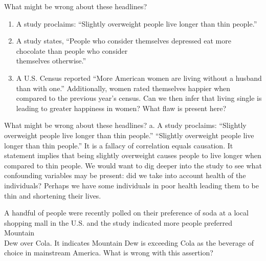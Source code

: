 \documentclass[11pt, chapterprefix=true]{scrbook}\usepackage[]{graphicx}\usepackage[]{color}
\begin{document}
\begin{exercises}

  \begin{exercise}  %

  What might be wrong about these headlines?

  \begin{enumerate}
  \item A study proclaims: ``Slightly overweight people live longer than thin people.''
  \item A study states, ``People who consider  themselves depressed eat more chocolate  than people who consider  \\ themselves  otherwise.''
  \item A U.S. Census reported ``More American women are living without a husband than with one.''  Additionally, women rated  themselves happier when \\ compared to the previous year's census.  Can we then infer that living single is leading to greater happiness in women?  What flaw is present here?
  \end{enumerate}

  \end{exercise}
  \begin{solution}  %

  What might be wrong about these headlines?
  a.	A study proclaims: ``Slightly overweight people live longer than thin people.'' ``Slightly overweight people live longer than thin people.''  It is a fallacy of correlation equals causation.  It statement implies that being slightly overweight causes people to live longer when compared to thin people.  We would want to dig deeper into the study to see what confounding variables may be present: did we take into account health of the individuals?  Perhaps we have some individuals in poor health leading them to be thin and shortening their lives.

  \end{solution}

   \begin{exercise}  %

A handful of people were recently polled on their preference of soda at a local shopping mall in the U.S. and the study indicated more people preferred Mountain \\ Dew over Cola.  It indicates Mountain Dew is exceeding Cola as the beverage of choice in mainstream America.  What is wrong with this assertion?


\end{exercise}
\end{exercises}
\end{document}
